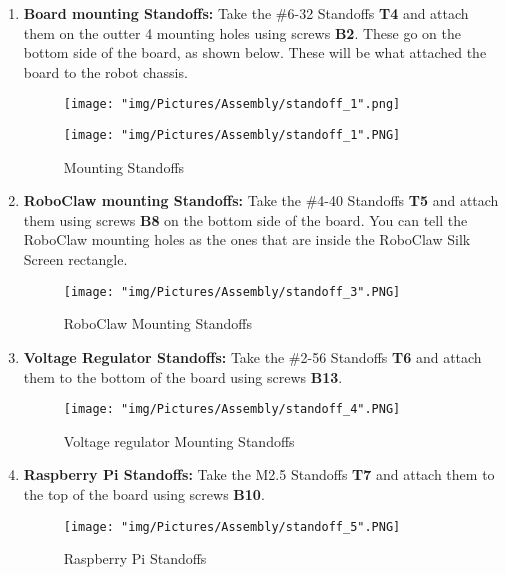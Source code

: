 \documentclass[12pt]{article}
\begin{document}
\begin{enumerate}
\item \textbf{Board mounting Standoffs:} Take the \#6-32 Standoffs \textbf{T4} and attach them on the outter 4 mounting holes using screws \textbf{B2}. These go on the bottom side of the board, as shown below. These will be what attached the board to the robot chassis.

\begin{figure}[H]
  \centering
  \begin{minipage}[b]{0.45\textwidth}
    \texttt{[image: "img/Pictures/Assembly/standoff\_1".png]}
  \end{minipage}
  \hfill
  \begin{minipage}[b]{0.45\textwidth}
    \texttt{[image: "img/Pictures/Assembly/standoff\_1".PNG]}
  \end{minipage}
  \caption{Mounting Standoffs}
  \label{standoffs_1}
\end{figure}

\item \textbf{RoboClaw mounting Standoffs:} Take the \#4-40 Standoffs \textbf{T5} and attach them using screws \textbf{B8} on the bottom side of the board. You can tell the RoboClaw mounting holes as the ones that are inside the RoboClaw Silk Screen rectangle.


\begin{figure}[H]
	\centering
	\texttt{[image: "img/Pictures/Assembly/standoff\_3".PNG]}
	\caption{RoboClaw Mounting Standoffs}
\end{figure}

\item \textbf{Voltage Regulator Standoffs:} Take the \#2-56 Standoffs \textbf{T6} and attach them to the bottom of the board using screws \textbf{B13}. 

\begin{figure}[H]
	\centering
	\texttt{[image: "img/Pictures/Assembly/standoff\_4".PNG]}
	\caption{Voltage regulator Mounting Standoffs}
\end{figure}

\item \textbf{Raspberry Pi  Standoffs:} Take the M2.5 Standoffs \textbf{T7} and attach them to the top of the board using screws \textbf{B10}. 

\begin{figure}[H]
	\centering
	\texttt{[image: "img/Pictures/Assembly/standoff\_5".PNG]}
	\caption{Raspberry Pi Standoffs}
\end{figure}

\end{enumerate}
\end{document}
